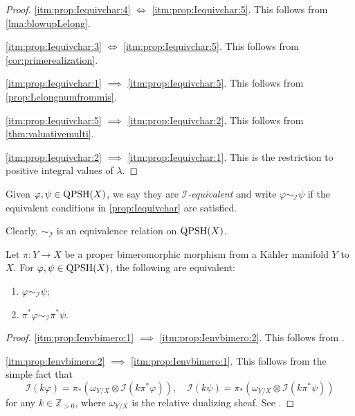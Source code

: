\begin{proof}
    \ref{itm:prop:Iequivchar:4} $\iff$ \ref{itm:prop:Iequivchar:5}. This follows from \cref{lma:blowupLelong}.

    \ref{itm:prop:Iequivchar:3} $\iff$ \ref{itm:prop:Iequivchar:5}. This follows from \cref{cor:primerealization}.

    \ref{itm:prop:Iequivchar:1} $\implies$ \ref{itm:prop:Iequivchar:5}. This follows from \cref{prop:Lelongnumfrommis}.

    \ref{itm:prop:Iequivchar:5} $\implies$ \ref{itm:prop:Iequivchar:2}. This follows from \cref{thm:valuativemulti}.

    \ref{itm:prop:Iequivchar:2} $\implies$ \ref{itm:prop:Iequivchar:1}. This is the restriction to positive integral values of $\lambda$.
\end{proof}


\begin{definition}\label{def:Iequiv}
    Given $\varphi,\psi\in \mathrm{QPSH}(X)$, we say they are \emph{$\mathcal{I}$-equivalent} and write $\varphi\sim_{\mathcal{I}}\psi$ if the equivalent conditions in \cref{prop:Iequivchar} are satisfied.
\end{definition}
Clearly, $\sim_{\mathcal{I}}$ is an equivalence relation on $\mathrm{QPSH}(X)$.

\begin{proposition}\label{prop:Ienvbimero}
    Let $\pi\colon Y\rightarrow X$ be a proper bimeromorphic morphism from a Kähler manifold $Y$ to $X$. For $\varphi,\psi\in \mathrm{QPSH}(X)$, the following are equivalent:
    \begin{enumerate}
        \item\label{itm:prop:Ienvbimero:1} $\varphi\sim_{\mathcal{I}}\psi$;
        \item\label{itm:prop:Ienvbimero:2} $\pi^*\varphi\sim_{\mathcal{I}}\pi^*\psi$.
    \end{enumerate}
\end{proposition}
\begin{proof}
    \ref{itm:prop:Ienvbimero:1} $\implies$ \ref{itm:prop:Ienvbimero:2}. This follows from .

    \ref{itm:prop:Ienvbimero:2} $\implies$ \ref{itm:prop:Ienvbimero:1}. This follows from the simple fact that
    \[
        \mathcal{I}(k\varphi)=\pi_* \left( \omega_{Y/X}\otimes \mathcal{I}(k\pi^*\varphi)  \right),\quad \mathcal{I}(k\psi)=\pi_* \left( \omega_{Y/X}\otimes \mathcal{I}(k\pi^*\psi)  \right)
    \]
    for any $k\in \mathbb{Z}_{>0}$, where $\omega_{Y/X}$ is the relative dualizing sheaf. See \cite[Proposition~5.8]{Dem12}.
\end{proof}

